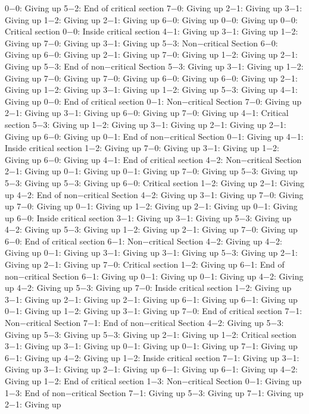 0−0: Giving up
5−2: End of critical section
7−0: Giving up
2−1: Giving up
3−1: Giving up
1−2: Giving up
2−1: Giving up
6−0: Giving up
0−0: Giving up
0−0: Critical section
0−0: Inside critical section
4−1: Giving up
3−1: Giving up
1−2: Giving up
7−0: Giving up
3−1: Giving up
5−3: Non−critical Section
6−0: Giving up
6−0: Giving up
2−1: Giving up
7−0: Giving up
1−2: Giving up
2−1: Giving up
5−3: End of non−critical Section
5−3: Giving up
3−1: Giving up
1−2: Giving up
7−0: Giving up
7−0: Giving up
6−0: Giving up
6−0: Giving up
2−1: Giving up
1−2: Giving up
3−1: Giving up
1−2: Giving up
5−3: Giving up
4−1: Giving up
0−0: End of critical section
0−1: Non−critical Section
7−0: Giving up
2−1: Giving up
3−1: Giving up
6−0: Giving up
7−0: Giving up
4−1: Critical section
5−3: Giving up
1−2: Giving up
3−1: Giving up
2−1: Giving up
2−1: Giving up
6−0: Giving up
0−1: End of non−critical Section
0−1: Giving up
4−1: Inside critical section
1−2: Giving up
7−0: Giving up
3−1: Giving up
1−2: Giving up
6−0: Giving up
4−1: End of critical section
4−2: Non−critical Section
2−1: Giving up
0−1: Giving up
0−1: Giving up
7−0: Giving up
5−3: Giving up
5−3: Giving up
5−3: Giving up
6−0: Critical section
1−2: Giving up
2−1: Giving up
4−2: End of non−critical Section
4−2: Giving up
3−1: Giving up
7−0: Giving up
7−0: Giving up
0−1: Giving up
1−2: Giving up
2−1: Giving up
0−1: Giving up
6−0: Inside critical section
3−1: Giving up
3−1: Giving up
5−3: Giving up
4−2: Giving up
5−3: Giving up
1−2: Giving up
2−1: Giving up
7−0: Giving up
6−0: End of critical section
6−1: Non−critical Section
4−2: Giving up
4−2: Giving up
0−1: Giving up
3−1: Giving up
3−1: Giving up
5−3: Giving up
2−1: Giving up
2−1: Giving up
7−0: Critical section
1−2: Giving up
6−1: End of non−critical Section
6−1: Giving up
0−1: Giving up
0−1: Giving up
4−2: Giving up
4−2: Giving up
5−3: Giving up
7−0: Inside critical section
1−2: Giving up
3−1: Giving up
2−1: Giving up
2−1: Giving up
6−1: Giving up
6−1: Giving up
0−1: Giving up
1−2: Giving up
3−1: Giving up
7−0: End of critical section
7−1: Non−critical Section
7−1: End of non−critical Section
4−2: Giving up
5−3: Giving up
5−3: Giving up
5−3: Giving up
2−1: Giving up
1−2: Critical section
3−1: Giving up
3−1: Giving up
0−1: Giving up
0−1: Giving up
7−1: Giving up
6−1: Giving up
4−2: Giving up
1−2: Inside critical section
7−1: Giving up
3−1: Giving up
3−1: Giving up
2−1: Giving up
6−1: Giving up
6−1: Giving up
4−2: Giving up
1−2: End of critical section
1−3: Non−critical Section
0−1: Giving up
1−3: End of non−critical Section
7−1: Giving up
5−3: Giving up
7−1: Giving up
2−1: Giving up
